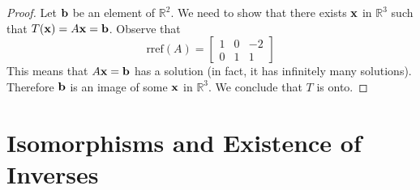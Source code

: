\documentclass{ximera}
\renewcommand{\vec}[1]{{\bf #1}}
\newcommand{\RR}{\mathbb{R}}
\begin{document}
\begin{example}
\begin{proof}

Let $\vec{b}$ be an element of $\RR^2$.  We need to show that there exists $\vec{x}$ in $\RR^3$ such that $T(\vec{x})=A\vec{x}=\vec{b}$. 
Observe that
 $$\text{rref}(A)=\begin{bmatrix}1 & 0 & -2\\0 & 1 & 1\end{bmatrix}$$
 This means that $A\vec{x}=\vec{b}$ has a solution (in fact, it has infinitely many solutions).  Therefore $\vec{b}$ is an image of some $\vec{x}$ in $\RR^3$. We conclude that $T$ is onto. 
 


\end{proof}
\end{example}

\section*{Isomorphisms and Existence of Inverses}
\end{document}
